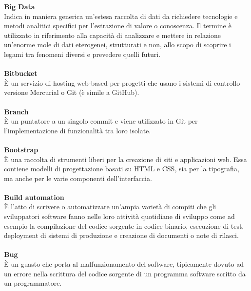 \textbf{Big Data}\\
Indica in maniera generica un'estesa raccolta di dati da richiedere tecnologie e metodi analitici specifici per l'estrazione di valore o conoscenza. Il termine è utilizzato in riferimento alla capacità di analizzare  e mettere in relazione un'enorme mole di dati eterogenei, strutturati e non, allo scopo di scoprire i legami tra fenomeni diversi e prevedere quelli futuri. \\ \\
\textbf{Bitbucket}\\
È un servizio di hosting web-based per progetti che usano i sistemi di controllo versione Mercurial o Git (è simile a GitHub). \\ \\
\textbf{Branch}\\
È un puntatore a un singolo commit e viene utilizzato in Git per l'implementazione di funzionalità tra loro isolate. \\ \\
\textbf{Bootstrap}\\
È una raccolta di strumenti liberi per la creazione di siti e applicazioni web. Essa contiene modelli di progettazione basati su HTML e CSS, sia per la tipografia, ma anche per le varie componenti dell'interfaccia. \\ \\
\textbf{Build automation}\\ 
È l'atto di scrivere o automatizzare un'ampia varietà di compiti che gli sviluppatori software fanno nelle loro attività quotidiane di sviluppo come ad esempio
la compilazione del codice sorgente in codice binario, esecuzione di test, deployment di sistemi di produzione e creazione di documenti o note di rilasci. \\ \\
\textbf{Bug} \\
È un guasto che porta al malfunzionamento del software, tipicamente dovuto ad un errore nella scrittura del codice sorgente di un programma software scritto da un programmatore.
\clearpage